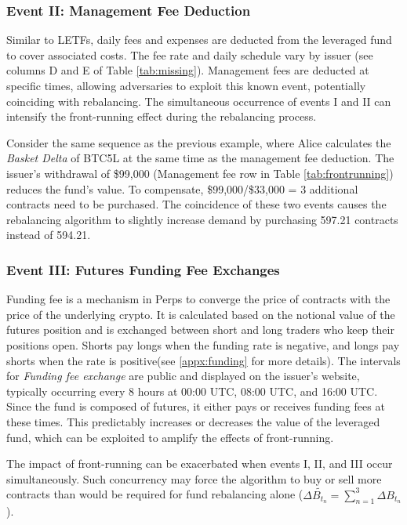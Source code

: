 
\subsubsection{Event II: Management Fee Deduction}
Similar to LETFs, daily fees and expenses are deducted from the leveraged fund to cover associated costs. The fee rate and daily schedule vary by issuer (see columns D and E of Table \ref{tab:missing}). Management fees are deducted at specific times, allowing adversaries to exploit this known event, potentially coinciding with rebalancing. The simultaneous occurrence of events I and II can intensify the front-running effect during the rebalancing process.

\begin{example}
	Consider the same sequence as the previous example, where Alice calculates the \textsl{Basket Delta} of BTC5L at the same time as the management fee deduction. The issuer's withdrawal of \$99,000 (Management fee row in Table \ref{tab:frontrunning}) reduces the fund's value. To compensate, \$99,000/\$33,000 = 3 additional contracts need to be purchased. The coincidence of these two events causes the rebalancing algorithm to slightly increase demand by purchasing 597.21 contracts instead of 594.21.
\end{example}

\subsubsection{Event III: Futures Funding Fee Exchanges}\label{fundingfee}
Funding fee is a mechanism in Perps to converge the price of contracts with the price of the underlying crypto. It is calculated based on the notional value of the futures position and is exchanged between short and long traders who keep their positions open. Shorts pay longs when the funding rate is negative, and longs pay shorts when the rate is positive(see \ref{appx:funding} for more details). The intervals for \textsl{Funding fee exchange} are public and displayed on the issuer's website, typically occurring every 8 hours at 00:00 UTC, 08:00 UTC, and 16:00 UTC. Since the fund is composed of futures, it either pays or receives funding fees at these times. This predictably increases or decreases the value of the leveraged fund, which can be exploited to amplify the effects of front-running.

The impact of front-running can be exacerbated when events I, II, and III occur simultaneously. Such concurrency may force the algorithm to buy or sell more contracts than would be required for fund rebalancing alone (\ie $\Delta{\tilde{B_{t_n}}}=\sum_{n=1}^{3}{\Delta{B_{t_{n}}}}$).

